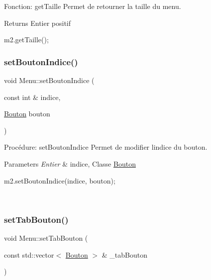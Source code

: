 Fonction\+: get\+Taille Permet de retourner la taille du menu. 

\begin{DoxyReturn}{Returns}
Entier positif 
\begin{DoxyCode}
m2.getTaille();
\end{DoxyCode}
 
\end{DoxyReturn}
\mbox{\label{classMenu_acedbb44af6fcc981aef033a585df2169}} 
\subsubsection{\texorpdfstring{set\+Bouton\+Indice()}{setBoutonIndice()}}
{\footnotesize\ttfamily void Menu\+::set\+Bouton\+Indice (\begin{DoxyParamCaption}\item[{const int \&}]{indice,  }\item[{\hyperlink{classBouton}{Bouton}}]{bouton }\end{DoxyParamCaption})}



Procédure\+: set\+Bouton\+Indice Permet de modifier l\textquotesingle{}indice du bouton\textquotesingle{}. 


\begin{DoxyParams}{Parameters}
{\em Entier} & indice, Classe \hyperlink{classBouton}{Bouton} 
\begin{DoxyCode}
m2.setBoutonIndice(indice, bouton);
\end{DoxyCode}
 \\
\hline
\end{DoxyParams}
\mbox{\label{classMenu_a45b3fe1a4d7cca82acabd3102d8bfd7c}} 
\subsubsection{\texorpdfstring{set\+Tab\+Bouton()}{setTabBouton()}}
{\footnotesize\ttfamily void Menu\+::set\+Tab\+Bouton (\begin{DoxyParamCaption}\item[{const std\+::vector$<$ \hyperlink{classBouton}{Bouton} $>$ \&}]{\+\_\+tab\+Bouton }\end{DoxyParamCaption})}



